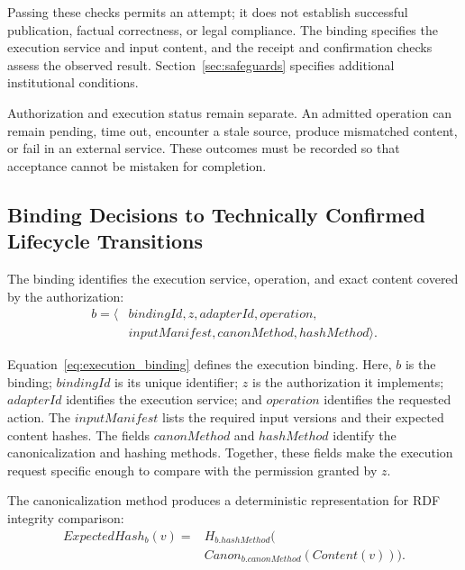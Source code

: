 \documentclass[journal]{IEEEtran}
\begin{document}
Passing these checks permits an attempt; it does not establish
successful publication, factual correctness, or legal compliance.
The binding specifies the execution service and input content,
and the receipt and confirmation checks assess the observed result.
Section~\ref{sec:safeguards} specifies additional institutional
conditions.

Authorization and execution status remain separate.
An admitted operation can remain pending, time out,
encounter a stale source, produce mismatched content,
or fail in an external service. These outcomes must be
recorded so that acceptance cannot be mistaken for completion.

\subsection{Binding Decisions to Technically Confirmed Lifecycle Transitions}
\label{sec:lifecycle_binding}

The binding identifies the execution service, operation,
and exact content covered by the authorization:
\begin{equation}
\label{eq:execution_binding}
\begin{aligned}
b=\langle&
bindingId,z,adapterId,operation,\\
&inputManifest,canonMethod,hashMethod\rangle.
\end{aligned}
\end{equation}

Equation~\ref{eq:execution_binding} defines the execution binding.
Here, $b$ is the binding; $bindingId$ is its unique identifier;
$z$ is the authorization it implements; $adapterId$ identifies
the execution service; and $operation$ identifies the requested
action. The $inputManifest$ lists the required input versions and
their expected content hashes. The fields $canonMethod$ and
$hashMethod$ identify the canonicalization and hashing methods.
Together, these fields make the execution request specific enough
to compare with the permission granted by $z$.

The canonicalization method produces a deterministic
representation for RDF integrity comparison:
\begin{equation}
\label{eq:expected_content_hash}
\begin{aligned}
ExpectedHash_b(v)={}&H_{b.hashMethod}\!\bigl(\\[-1mm]
&Canon_{b.canonMethod}(Content(v))\bigr).
\end{aligned}
\end{equation}
\end{document}
